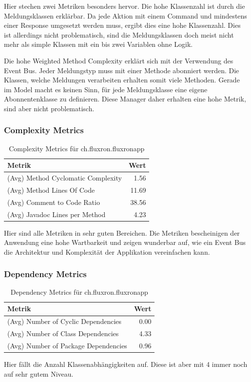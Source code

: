 Hier stechen zwei Metriken besonders hervor. Die hohe Klassenzahl ist durch die Meldungsklassen erklärbar. Da jede Aktion mit einem Command und mindestens einer Response umgesetzt werden muss, ergibt dies eine hohe Klassenzahl. Dies ist allerdings nicht problematisch, sind die Meldungsklassen doch meist nicht mehr als simple Klassen mit ein bis zwei Variablen ohne Logik.

Die hohe Weighted Method Complexity erklärt sich mit der Verwendung des Event Bus. Jeder Meldungstyp muss mit einer Methode abonniert werden. Die Klassen, welche Meldungen verarbeiten erhalten somit viele Methoden. Gerade im Model macht es keinen Sinn, für jede Meldungsklasse eine eigene Abonnentenklasse zu definieren. Diese Manager daher erhalten eine hohe Metrik, sind aber nicht problematisch.

\subsubsection{Complexity Metrics}

\begin{table}[H]
	\begin{center}
	  \begin{tabular}{ | l | r | }
	    \hline
	    \textbf{Metrik} & \textbf{Wert} \\ \hline
	    (Avg) Method Cyclomatic Complexity & 1.56 \\ \hline
  	    (Avg) Method Lines Of Code & 11.69 \\ \hline
  	    (Avg) Comment to Code Ratio & 38.56 \\ \hline
  	    (Avg) Javadoc Lines per Method & 4.23 \\ \hline
	  \end{tabular}
	  \caption{Complexity Metrics für ch.fluxron.fluxronapp}
  \end{center}
\end{table}

Hier sind alle Metriken in sehr guten Bereichen. Die Metriken bescheinigen der Anwendung eine hohe Wartbarkeit und zeigen wunderbar auf, wie ein Event Bus die Architektur und Komplexität der Applikation vereinfachen kann.

\subsubsection{Dependency Metrics}

\begin{table}[H]
	\begin{center}
	  \begin{tabular}{ | l | r | }
	    \hline
	    \textbf{Metrik} & \textbf{Wert} \\ \hline
	    (Avg) Number of Cyclic Dependencies & 0.00 \\ \hline
  	    (Avg) Number of Class Dependencies & 4.33 \\ \hline
  	    (Avg) Number of Package Dependencies & 0.96 \\ \hline
	  \end{tabular}
	  \caption{Dependency Metrics für ch.fluxron.fluxronapp}
  \end{center}
\end{table}

Hier fällt die Anzahl Klassenabhängigkeiten auf. Diese ist aber mit 4 immer noch auf sehr gutem Niveau.